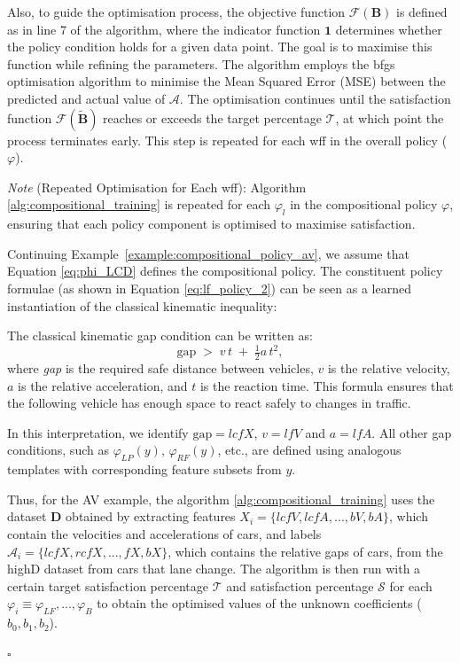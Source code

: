 Also, to guide the optimisation process, the objective function $\mathcal{F}(\mathbf{B})$ is defined as in line 7 of the algorithm, where the indicator function $\mathbf{1}$ determines whether the policy condition holds for a given data point. The goal is to maximise this function while refining the parameters. The algorithm employs the  \gls{bfgs} optimisation algorithm \cite{doi:https://doi.org/10.1002/9781118723203.ch3} to minimise the Mean Squared Error (MSE) between the predicted and actual value of $\mathcal{A}$. The optimisation continues until the satisfaction function $\mathcal{F}(\tilde{\mathbf{B}})$ reaches or exceeds the target percentage $\mathcal{T}$, at which point the process terminates early. This step is repeated for each wff in the overall policy ($\varphi$).


\vspace{0.5em}
\noindent \textit{Note} (Repeated Optimisation for Each wff):
Algorithm \ref{alg:compositional_training} is repeated for each $\varphi_l$ in the compositional policy $\varphi$, ensuring that each policy component is optimised to maximise satisfaction.


\begin{example}
\label{example:compositional_policy_template}
Continuing Example~\ref{example:compositional_policy_av}, we assume that Equation \ref{eq:phi_LCD} defines the compositional policy. The constituent policy formulae (as shown in Equation \ref{eq:lf_policy_2}) can be seen as a learned instantiation of the classical kinematic inequality:

The classical kinematic gap condition can be written as: 
\begin{equation}
 \text{gap} \;>\; v\,t \;+\; \tfrac{1}{2} a\,t^2,
  \label{eq:uniform_motion_ref}
\end{equation}
where \textit{gap} is the required safe distance between vehicles, $v$ is the relative velocity, $a$ is the relative acceleration, and $t$ is the reaction time. This formula ensures that the following vehicle has enough space to react safely to changes in traffic.

In this interpretation, we identify $\text{gap}=lcfX$, $v = lfV$ and $a = lfA$. All other gap conditions, such as $\varphi_{LP}(y)$, $\varphi_{RF}(y)$, etc., are defined using analogous templates with corresponding feature subsets from $y$. 

Thus, for the AV example, the algorithm \ref{alg:compositional_training} uses the dataset $\mathbf{D}$ obtained by extracting features $X_i = \{lcfV,  lcfA,...,bV,bA\}$, which contain the velocities and accelerations of cars, and labels $\mathcal{A}_i = \{lcfX,rcfX,...,fX,bX\}$, which contains the relative gaps of cars, from the highD dataset from cars that lane change. The algorithm is then run with a certain target satisfaction percentage $\mathcal{T}$ and satisfaction percentage $\mathcal{S}$ for each $\varphi_i \equiv \varphi_{LF},...,\varphi_{B}$ to obtain the optimised values of the unknown coefficients ($b_0, b_1, b_2$).

$\square$
\end{example}


